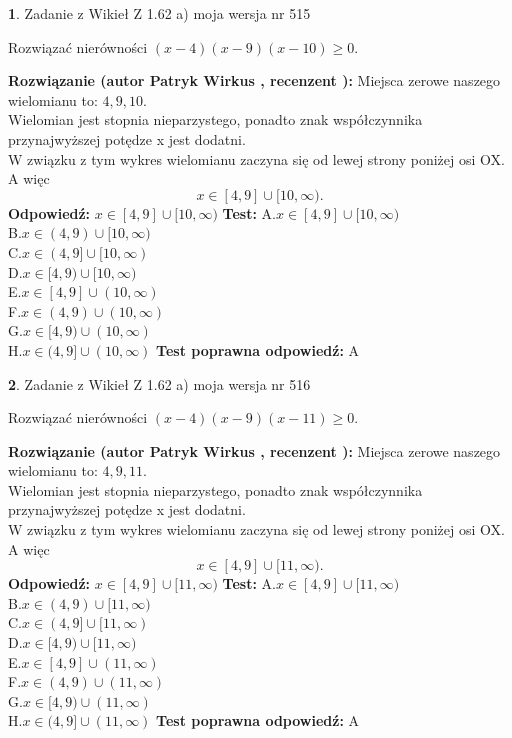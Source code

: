 \documentclass[12pt, a4paper]{article}
\theoremstyle{definition} %
\newtheorem{zad}{}
\newcommand{\zadStart}[1]{\begin{zad}#1\newline}
\newcommand{\zadStop}{\end{zad}}
\newcommand{\rozwStart}[2]{\noindent \textbf{Rozwiązanie (autor #1 , recenzent #2): }\newline}
\newcommand{\rozwStop}{\newline}
\newcommand{\odpStart}{\noindent \textbf{Odpowiedź:}\newline}
\newcommand{\odpStop}{\newline}
\newcommand{\testStart}{\noindent \textbf{Test:}\newline}
\newcommand{\testStop}{\newline}
\newcommand{\kluczStart}{\noindent \textbf{Test poprawna odpowiedź:}\newline}
\newcommand{\kluczStop}{\newline}
\begin{document}
\zadStart{Zadanie z Wikieł Z 1.62 a) moja wersja nr 515}

Rozwiązać nierówności $(x-4)(x-9)(x-10)\ge0$.
\zadStop
\rozwStart{Patryk Wirkus}{}
Miejsca zerowe naszego wielomianu to: $4, 9, 10$.\\
Wielomian jest stopnia nieparzystego, ponadto znak współczynnika przy\linebreak najwyższej potędze x jest dodatni.\\ W związku z tym wykres wielomianu zaczyna się od lewej strony poniżej osi OX. A więc $$x \in [4,9] \cup [10,\infty).$$
\rozwStop
\odpStart
$x \in [4,9] \cup [10,\infty)$
\odpStop
\testStart
A.$x \in [4,9] \cup [10,\infty)$\\
B.$x \in (4,9) \cup [10,\infty)$\\
C.$x \in (4,9] \cup [10,\infty)$\\
D.$x \in [4,9) \cup [10,\infty)$\\
E.$x \in [4,9] \cup (10,\infty)$\\
F.$x \in (4,9) \cup (10,\infty)$\\
G.$x \in [4,9) \cup (10,\infty)$\\
H.$x \in (4,9] \cup (10,\infty)$
\testStop
\kluczStart
A
\kluczStop



\zadStart{Zadanie z Wikieł Z 1.62 a) moja wersja nr 516}

Rozwiązać nierówności $(x-4)(x-9)(x-11)\ge0$.
\zadStop
\rozwStart{Patryk Wirkus}{}
Miejsca zerowe naszego wielomianu to: $4, 9, 11$.\\
Wielomian jest stopnia nieparzystego, ponadto znak współczynnika przy\linebreak najwyższej potędze x jest dodatni.\\ W związku z tym wykres wielomianu zaczyna się od lewej strony poniżej osi OX. A więc $$x \in [4,9] \cup [11,\infty).$$
\rozwStop
\odpStart
$x \in [4,9] \cup [11,\infty)$
\odpStop
\testStart
A.$x \in [4,9] \cup [11,\infty)$\\
B.$x \in (4,9) \cup [11,\infty)$\\
C.$x \in (4,9] \cup [11,\infty)$\\
D.$x \in [4,9) \cup [11,\infty)$\\
E.$x \in [4,9] \cup (11,\infty)$\\
F.$x \in (4,9) \cup (11,\infty)$\\
G.$x \in [4,9) \cup (11,\infty)$\\
H.$x \in (4,9] \cup (11,\infty)$
\testStop
\kluczStart
A
\kluczStop
\end{document}
